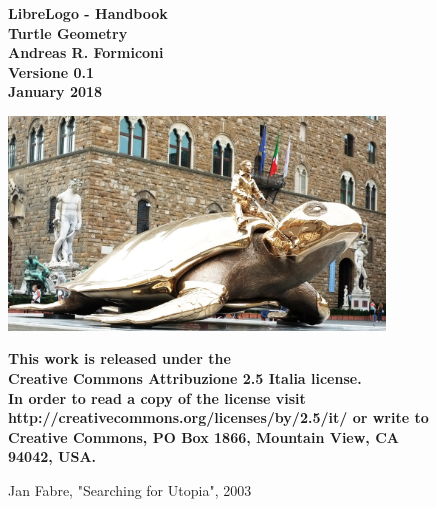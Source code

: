 \begin{titlepage}



\begin{figure}
   \centering

\vfill
{\bfseries\huge
   LibreLogo - Handbook\\
   \vskip5mm \Large
   Turtle Geometry\\
   \vskip2cm
   \large
   Andreas R. Formiconi\\
   \vskip8mm
   \normalsize 
   Versione 0.1\\
   \vskip4mm
   January 2018
   \vskip2cm
}    
\vfill

   \includegraphics[width=10.0cm]{./images/frontespizio/utopia.jpg}
   \caption{Jan Fabre, "Searching for Utopia", 2003} 
   \label{utopia}


\vfill
{\bfseries \vskip4cm \footnotesize 
This work is released under the 
\\Creative Commons Attribuzione 2.5 Italia license. 
\\In order to read a copy of the license visit
	http://creativecommons.org/licenses/by/2.5/it/ or write to Creative Commons, PO Box 1866, Mountain View, CA 94042, USA.\\
}    
\vfill

\end{figure}

\end{titlepage}

